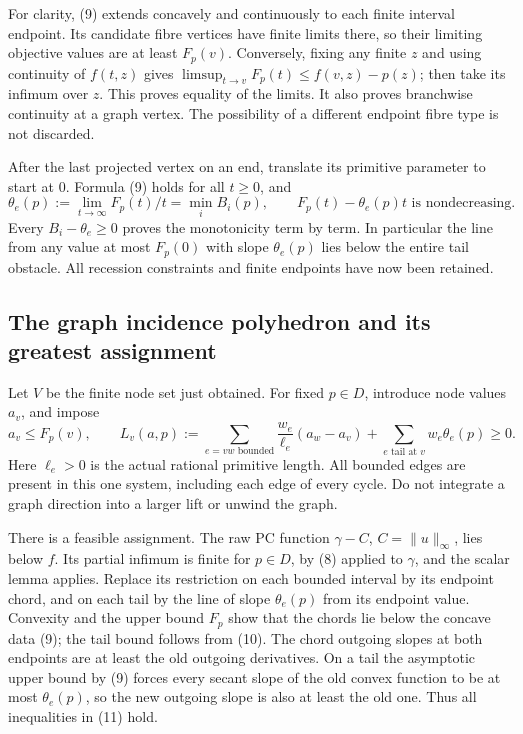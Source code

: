 \documentclass[
  11pt,
]{article}
\begin{document}
For clarity, (9) extends concavely and continuously to each finite
interval endpoint. Its candidate fibre vertices have finite limits
there, so their limiting objective values are at least \(F_p(v)\).
Conversely, fixing any finite \(z\) and using continuity of \(f(t,z)\)
gives \(\limsup_{t\to v}F_p(t)\leq f(v,z)-p(z)\); then take its infimum
over \(z\). This proves equality of the limits. It also proves
branchwise continuity at a graph vertex. The possibility of a different
endpoint fibre type is not discarded.

After the last projected vertex on an end, translate its primitive
parameter to start at 0. Formula (9) holds for all \(t\geq0\), and \[
 \theta_e(p):=\lim_{t\to\infty}F_p(t)/t=\min_i B_i(p),\qquad
 F_p(t)-\theta_e(p)t\text{ is nondecreasing}.             \tag{10}
\] Every \(B_i-\theta_e\geq0\) proves the monotonicity term by term. In
particular the line from any value at most \(F_p(0)\) with slope
\(\theta_e(p)\) lies below the entire tail obstacle. All recession
constraints and finite endpoints have now been retained.

\subsection{The graph incidence polyhedron and its greatest
assignment}\label{the-graph-incidence-polyhedron-and-its-greatest-assignment}

Let \(V\) be the finite node set just obtained. For fixed \(p\in D\),
introduce node values \(a_v\), and impose \[
 a_v\leq F_p(v),\qquad
 L_v(a,p):=\sum_{e=vw\text{ bounded}}\frac{w_e}{\ell_e}(a_w-a_v)
                +\sum_{e\text{ tail at }v}w_e\theta_e(p)\geq0.             \tag{11}
\] Here \(\ell_e>0\) is the actual rational primitive length. All
bounded edges are present in this one system, including each edge of
every cycle. Do not integrate a graph direction into a larger lift or
unwind the graph.

There is a feasible assignment. The raw PC function \(\gamma-C\),
\(C=\|u\|_\infty\), lies below \(f\). Its partial infimum is finite for
\(p\in D\), by (8) applied to \(\gamma\), and the scalar lemma applies.
Replace its restriction on each bounded interval by its endpoint chord,
and on each tail by the line of slope \(\theta_e(p)\) from its endpoint
value. Convexity and the upper bound \(F_p\) show that the chords lie
below the concave data (9); the tail bound follows from (10). The chord
outgoing slopes at both endpoints are at least the old outgoing
derivatives. On a tail the asymptotic upper bound by (9) forces every
secant slope of the old convex function to be at most \(\theta_e(p)\),
so the new outgoing slope is also at least the old one. Thus all
inequalities in (11) hold.
\end{document}
